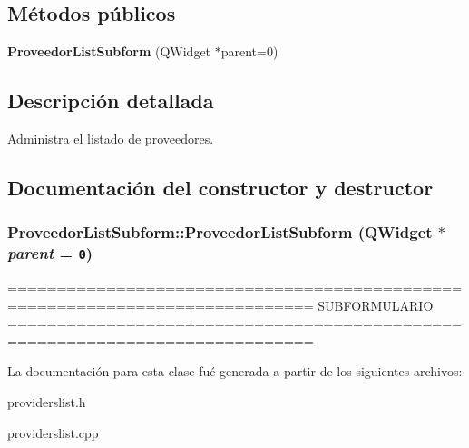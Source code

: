 \subsection*{M\'{e}todos p\'{u}blicos}
\begin{CompactItemize}
\item 
{\bf Proveedor\-List\-Subform} (QWidget $\ast$parent=0)
\end{CompactItemize}


\subsection{Descripci\'{o}n detallada}
Administra el listado de proveedores. 



\subsection{Documentaci\'{o}n del constructor y destructor}
\subsubsection{\setlength{\rightskip}{0pt plus 5cm}Proveedor\-List\-Subform::Proveedor\-List\-Subform (QWidget $\ast$ {\em parent} = {\tt 0})}\label{classProveedorListSubform_a0}


============================================================================= SUBFORMULARIO ============================================================================= 

La documentaci\'{o}n para esta clase fu\'{e} generada a partir de los siguientes archivos:\begin{CompactItemize}
\item 
providerslist.h\item 
providerslist.cpp\end{CompactItemize}
